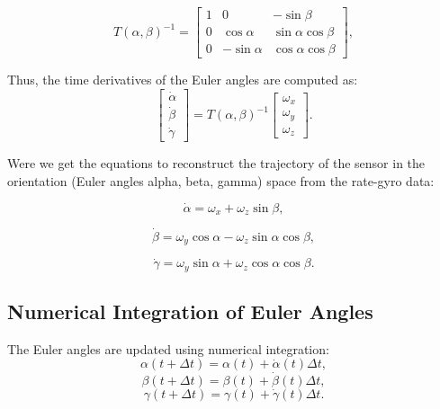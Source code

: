 \documentclass[12pt]{article}
\begin{document}
\begin{equation}
T(\alpha, \beta)^{-1} =
\begin{bmatrix}
\label{eq:jacobian_inverse}
1 & 0 & -\sin\beta \\
0 & \cos\alpha & \sin\alpha \cos\beta \\
0 & -\sin\alpha & \cos\alpha \cos\beta
\end{bmatrix},
\end{equation}


Thus, the time derivatives of the Euler angles are computed as:
\begin{equation}
\begin{bmatrix}
\label{eq:euler_derivatives}
\dot{\alpha} \\
\dot{\beta} \\
\dot{\gamma}
\end{bmatrix}
=
T(\alpha, \beta)^{-1}
\begin{bmatrix}
\omega_x \\
\omega_y \\
\omega_z
\end{bmatrix}.  
\end{equation}


Were we get the equations to reconstruct the trajectory of the sensor in the orientation
(Euler angles alpha, beta, gamma) space from the rate-gyro data:

\begin{equation}
\label{eq:alpha}
\dot{\alpha} = \omega_x + \omega_z \sin\beta,
\end{equation}


\begin{equation}
\label{eq:beta}
\dot{\beta} = \omega_y \cos\alpha - \omega_z \sin\alpha \cos\beta,  
\end{equation}


\begin{equation}
\label{eq:gamma}
\dot{\gamma} = \omega_y \sin\alpha + \omega_z \cos\alpha \cos\beta.
\end{equation}


\subsection{Numerical Integration of Euler Angles}
The Euler angles are updated using numerical integration:
\begin{equation}
\label{eq:integration_alpha}
\alpha(t + \Delta t) = \alpha(t) + \dot{\alpha}(t) \Delta t,
\end{equation}
\begin{equation}
\label{eq:integration_beta}
\beta(t + \Delta t) = \beta(t) + \dot{\beta}(t) \Delta t,
\end{equation}
\begin{equation}
\label{eq:integration_gamma}
\gamma(t + \Delta t) = \gamma(t) + \dot{\gamma}(t) \Delta t.
\end{equation}
\end{document}
